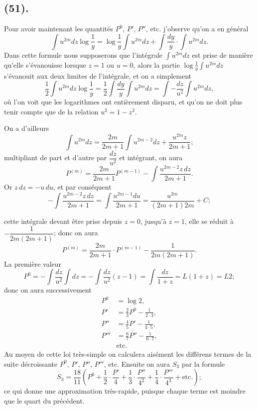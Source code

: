 \documentclass{article}
\begin{document}
\subsection*{(51).}

Pour avoir maintenant les quantités $P^{0}$, $P'$, $P''$, etc. j'observe qu'on a en général
\[ \int u^{2m}dz\log\frac{1}{y}=\log\frac{1}{y}\int u^{2m}dz+\int\frac{dy}{y}\cdot\int u^{2m}dz. \]
Dans cette formule nous supposerons que l'intégrale $\displaystyle\int u^{2m}dz$ est prise de manière qu'elle s'évanouisse lorsque $z=1$ ou $u=0$, alors la partie $\displaystyle\log\frac{1}{y}\int u^{2m}dz$ s'évanouit aux deux limites de l'intégrale, et on a simplement
\[ \frac{1}{2}\int u^{2m}dz\log\frac{1}{y}=\frac{1}{2}\int\frac{dy}{y}\int u^{2m}dz=\int-\frac{dz}{u^{2}}\int u^{2m}dz, \]
où l'on voit que les logarithmes ont entièrement disparu, et qu'on ne doit plus tenir compte que de la relation $u^{2}=1-z^{2}$.

On a d'ailleurs
\[ \int u^{2m}dz=\frac{2m}{2m+1}\int u^{2m-2}dz+\frac{u^{2m}z}{2m+1}; \]
multipliant de part et d'autre par $\dfrac{dz}{u^{2}}$ et intégrant, on aura
\[ P^{(m)}=\frac{2m}{2m+1}P^{(m-1)}-\int\frac{u^{2m-2}z\,dz}{2m+1}. \]
Or $z\,dz=-u\,du$, et par conséquent
\[ -\int\frac{u^{2m-2}z\,dz}{2m+1}=\int\frac{u^{2m-1}du}{2m+1}=\frac{u^{2m}}{(2m+1)2m}+C; \]

cette intégrale devant être prise depuis $z=0$, jusqu'à $z=1$, elle se réduit à $-\dfrac{1}{2m(2m+1)}$; donc on aura
\[ P^{(m)}=\frac{2m}{2m+1}\cdot P^{(m-1)}-\frac{1}{2m(2m+1)}. \]
La première valeur
\[ P^{0}=-\int\frac{dz}{u^{2}}\int dz=-\int\frac{dz}{u^{2}}(z-1)=\int\frac{dz}{1+z}=L(1+z)=L2; \]
donc on aura successivement
\[ \begin{aligned} P^{0}&=\log 2,\\ P'&=\frac{2}{3}P^{0}-\frac{1}{2\cdot 3},\\ P''&=\frac{4}{5}P'-\frac{1}{4\cdot 5},\\ P'''&=\frac{6}{7}P''-\frac{1}{6\cdot 7},\\ &\text{etc.} \end{aligned} \]
Au moyen de cette loi très-simple on calculera aisément les différens termes de la suite décroissante $P^{0}$, $P'$, $P''$, $P'''$, etc. Ensuite on aura $S_{3}$ par la formule
\[ S_{3}=\frac{18}{11}\left(P^{0}+\frac{1}{2}\cdot\frac{P'}{4}+\frac{1}{3}\cdot\frac{P''}{4^{2}}+\frac{1}{4}\cdot\frac{P'''}{4^{3}}+\text{etc.}\right); \]
ce qui donne une approximation très-rapide, puisque chaque terme est moindre que le quart du précédent.
\end{document}
